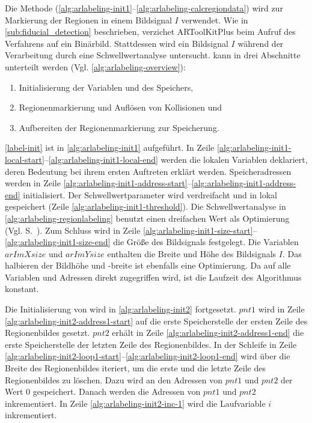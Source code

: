 Die Methode  (\autoref{alg:arlabeling-init1}--\autoref{alg:arlabeling-calcregiondata}) wird zur
 Markierung der Regionen in einem Bildsignal $I$ verwendet. Wie in \autoref{sub:fiducial_detection} beschrieben,
 verzichet ARToolKitPlus beim Aufruf des Verfahrens auf ein Binärbild. Stattdessen wird ein Bildsignal $I$ während der
 Verarbeitung durch eine Schwellwertanalyse untersucht.  kann in drei Abschnitte unterteilt werden
 (Vgl. \autoref{alg:arlabeling-overview}):

\begin{enumerate}
	\item Initialisierung der Variablen und des Speichers, \label{label-init}
	\item Regionenmarkierung und Auflösen von Kollisionen und \label{label-region}
	\item Aufbereiten der Regionenmarkierung zur Speicherung. \label{label-cleaning}
\end{enumerate}



\autoref{label-init} ist in \autoref{alg:arlabeling-init1} aufgeführt. In Zeile
 \ref{alg:arlabeling-init1-local-start}--\ref{alg:arlabeling-init1-local-end} werden die lokalen Variablen deklariert,
 deren Bedeutung bei ihrem ersten Auftreten erklärt werden. Speicheradressen werden in Zeile
 \ref{alg:arlabeling-init1-address-start}--\ref{alg:arlabeling-init1-address-end} initialisiert. Der
 Schwellwertparameter wird verdreifacht und in lokal gespeichert (Zeile \ref{alg:arlabeling-init1-threshold}). Die
 Schwellwertanalyse in \autoref{alg:arlabeling-regionlabeling} benutzt einen dreifachen Wert als Optimierung
 (Vgl. S.~\pageref{sub:arlabel-threshold}). Zum Schluss wird in Zeile
 \ref{alg:arlabeling-init1-size-start}--\ref{alg:arlabeling-init1-size-end} die Größe des Bildsignals festgelegt. Die
 Variablen $\mathit{arImXsize}$ und $\mathit{arImYsize}$ enthalten die Breite und Höhe des Bildsignals $I$. Das
 halbieren der Bildhöhe und -breite ist ebenfalls eine Optimierung. Da auf alle Variablen und Adressen direkt
 zugegriffen wird, ist die Laufzeit des Algorithmus konstant.



Die Initialisierung von  wird in \autoref{alg:arlabeling-init2} fortgesetzt. $\mathit{pnt1}$ wird
 in Zeile \ref{alg:arlabeling-init2-address1-start} auf die erste Speicherstelle der ersten Zeile des Regionenbildes
 gesetzt. $\mathit{pnt2}$ erhält in Zeile \ref{alg:arlabeling-init2-address1-end} die erste Speicherstelle der
 letzten Zeile des Regionenbildes. In der Schleife in Zeile
 \ref{alg:arlabeling-init2-loop1-start}--\ref{alg:arlabeling-init2-loop1-end} wird über die Breite des Regionenbildes
 iteriert, um die erste und die letzte Zeile des Regionenbildes zu löschen. Dazu wird an den Adressen von
 $\mathit{pnt1}$ und $\mathit{pnt2}$ der Wert $0$ gespeichert. Danach werden die Adressen von $\mathit{pnt1}$ und
 $\mathit{pnt2}$ inkrementiert. In Zeile \ref{alg:arlabeling-init2-inc-1} wird die Laufvariable $i$ inkrementiert.

